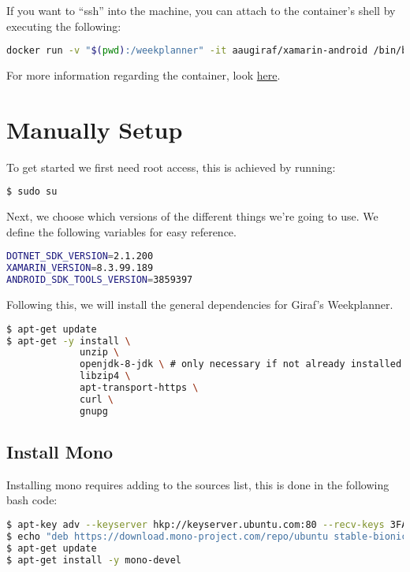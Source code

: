 If you want to ``ssh'' into the machine, you can attach to the
container's shell by executing the following:

\begin{lstlisting}[language=bash]
docker run -v "$(pwd):/weekplanner" -it aaugiraf/xamarin-android /bin/bash
\end{lstlisting}

For more information regarding the container, look
\href{https://cloud.docker.com/u/aaugiraf/repository/docker/aaugiraf/xamarin-android/general}{here}.

\section{Manually Setup}

To get started we first need root access, this is achieved by running:

\begin{lstlisting}[language=bash]
$ sudo su
\end{lstlisting}

Next, we choose which versions of the different things we're going to
use. We define the following variables for easy reference.

\begin{lstlisting}[language=bash]
DOTNET_SDK_VERSION=2.1.200
XAMARIN_VERSION=8.3.99.189
ANDROID_SDK_TOOLS_VERSION=3859397
\end{lstlisting}

Following this, we will install the general dependencies for Giraf's
Weekplanner.

\begin{lstlisting}[language=bash]
$ apt-get update
$ apt-get -y install \
             unzip \
             openjdk-8-jdk \ # only necessary if not already installed
             libzip4 \
             apt-transport-https \
             curl \
             gnupg
\end{lstlisting}

\subsection{Install Mono}

Installing mono requires adding to the sources list, this is done in the
following bash code:

\begin{lstlisting}[language=bash]
$ apt-key adv --keyserver hkp://keyserver.ubuntu.com:80 --recv-keys 3FA7E0328081BFF6A14DA29AA6A19B38D3D831EF
$ echo "deb https://download.mono-project.com/repo/ubuntu stable-bionic main" | tee /etc/apt/sources.list.d/mono-official-stable.list
$ apt-get update
$ apt-get install -y mono-devel
\end{lstlisting}

